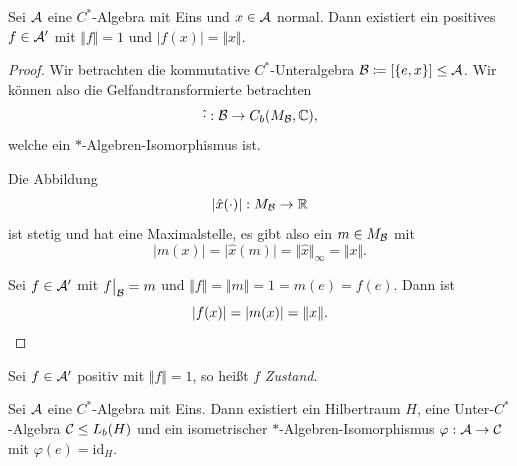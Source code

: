 \begin{lemma}
    Sei $\mathcal{A}$ eine $C^*$-Algebra mit Eins und $x \in \mathcal{A}$ normal. Dann existiert ein positives $f \in \mathcal{A}'$ mit $\Vert f \Vert = 1$ und $\vert f(x) \vert = \Vert x \Vert$.
\end{lemma}

\begin{proof}
    Wir betrachten die kommutative $C^*$-Unteralgebra $\mathcal{B} \coloneqq [\{e, x\}] \leq \mathcal{A}$. Wir können also die Gelfandtransformierte betrachten
    $$ \hat{\cdot} : \mathcal{B} \to C_b(M_{\mathcal{B}}, \mathbb{C}), $$
    welche ein $\ast$-Algebren-Isomorphismus ist.

    Die Abbildung
    $$ \vert \hat{x}(\cdot) \vert : M_{\mathcal{B}} \to \mathbb{R} $$
    ist stetig und hat eine Maximalstelle, es gibt also ein $m \in M_{\mathcal{B}}$ mit
    $$ \vert m(x) \vert = \vert \hat{x}(m) \vert = \Vert \hat{x} \Vert_\infty = \Vert x \Vert. $$

    Sei $f \in \mathcal{A}'$ mit $\restr{f}{\Ba} = m$ und $\Vert f \Vert = \Vert m \Vert = 1 = m(e) = f(e)$. Dann ist
    \[
        \vert f(x) \vert = \vert m(x) \vert = \Vert x \Vert. \qedhere
    \]
\end{proof}

\begin{definition}
    Sei $f \in \mathcal{A}'$ positiv mit $\Vert f \Vert = 1$, so heißt $f$ \emph{Zustand}.
\end{definition}

\begin{theorem}
    Sei $\mathcal{A}$ eine $C^*$-Algebra mit Eins. Dann existiert ein Hilbertraum $H$, eine Unter-$C^*$-Algebra $\mathcal{C} \leq L_b(H)$ und ein isometrischer $\ast$-Algebren-Isomorphismus $\varphi : \mathcal{A} \to \mathcal{C}$ mit $\varphi(e) = \mathrm{id}_H$.
\end{theorem}


